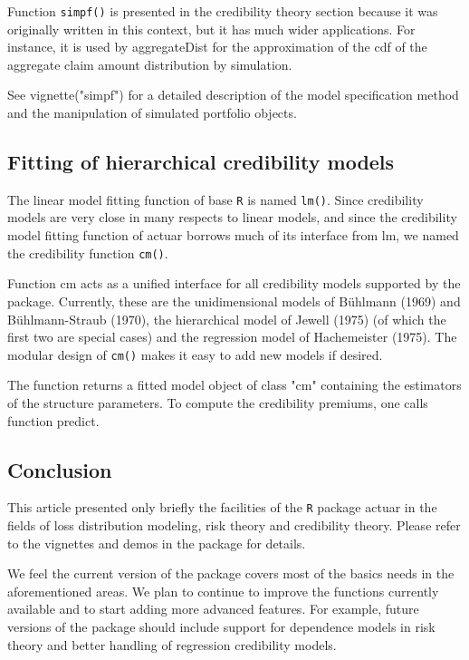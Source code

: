 \documentclass[12pt]{article}
\begin{document}
Function \texttt{simpf()} is presented in the credibility theory section because it was originally written in this context, but it has much wider applications. For instance, it is used by aggregateDist for the approximation of the cdf of the aggregate claim amount distribution by simulation.

See vignette("simpf") for a detailed description of the model specification method and the manipulation of simulated portfolio objects.

\subsection{Fitting of hierarchical credibility models}

The linear model fitting function of base \texttt{R} is named \texttt{lm()}. Since credibility models are very close in many respects to linear models, and since the credibility model fitting function of actuar borrows much of its interface from lm, we named the credibility function \texttt{cm()}.

Function cm acts as a unified interface for all credibility models supported by the package. Currently, these are the unidimensional models of Bühlmann (1969) and Bühlmann-Straub (1970), the hierarchical model of Jewell (1975) (of which the first two are special cases) and the regression model of Hachemeister (1975). The modular design of \texttt{cm()} makes it easy to add new models if desired.

The function returns a fitted model object of class "cm" containing the estimators of the structure parameters. To compute the credibility premiums, one calls function predict.

\subsection{Conclusion}

This article presented only briefly the facilities of the \texttt{R} package actuar in the fields of loss distribution modeling, risk theory and credibility theory. Please refer to the vignettes and demos in the package for details.

We feel the current version of the package covers most of the basics needs in the aforementioned areas. We plan to continue to improve the functions currently available and to start adding more advanced features. For example, future versions of the package should include support for dependence models in risk theory and better handling of regression credibility models.
\end{document}
